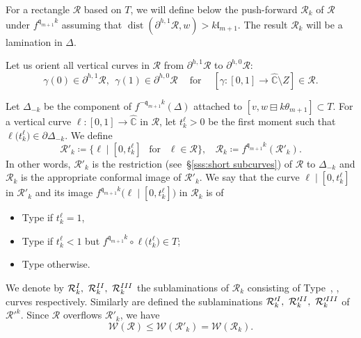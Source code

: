 \documentclass{amsart}
\renewcommand{\sp}{{\ \ }}
\newcommand{\1}{{\mathbb 1 }}
\newcommand{\Width}{{\mathcal W}}
\newcommand\RR{\mathcal{R}}
\newcommand{\qq}{\mathfrak{q}}
\newcommand{\length}{{\mathfrak l}}
\newcommand{\wC}{\widehat{\mathbb{C}}}
\theoremstyle{remark}
\numberwithin{equation}{section}
\theoremstyle{definition}
\newcommand{\dist}{\operatorname{dist}}
\newcommand{\RN}[1]{\MakeUppercase{\romannumeral#1}}%
\begin{document}
For a rectangle $\RR$ based on $ T$, we will define below the push-forward $\RR_k$ of $\RR$ under $f^{\qq_{m+1}k}$ assuming that $\dist (\partial ^{h,1}\RR,w)>k\length_{m+1}$. The result $\RR_k$ will be a lamination in $\Delta$. 


Let us orient all vertical curves in $\RR$ from $\partial^{h,1} \RR$ to $\partial^{h,0} \RR $:
\begin{equation}
\gamma(0)\in \partial^{h,1}\RR,\sp  \gamma(1)\in \partial^{h,0}\RR\sp \sp\text{ for }\sp\sp [\gamma\colon [0,1]\to \wC\setminus Z]\in \RR.
\end{equation}





Let $\Delta_{-k}$ be the component of $f^{-\qq_{m+1}k}(\Delta)$ attached to $[v,w \boxminus k\theta_{m+1} ]\subset T$. For a vertical curve $\ell\colon [0,1]\to \wC$ in $\RR$, let $t_k^\ell >0$ be the first moment such that $\ell\big(t^\ell_k\big)\in \partial \Delta_{-k}$. 
We define 
\[\RR'_k\coloneqq \{\ell\mid [0,t_k^\ell] \sp \text{ for }\sp \ell\in \RR\},\sp\sp \RR_k\coloneqq f^{\qq_{m+1}k }(\RR'_k).\]
In other words, $\RR'_k$ is the restriction (see~\S\ref{sss:short subcurves}) of $\RR$ to $\Delta_{-k}$ and $\RR_k$ is the appropriate conformal image of $\RR'_k$. 
 We say that the curve $\ell\mid [0,t_k^\ell]$ in $\RR'_k$ and its image $f^{\qq_{m+1}k}\big(\ell\mid [0,t_k^\ell] \big)$ in $\RR_k$ is of
\begin{itemize}
\item {Type \RN{1}} if $t_k^\ell=1$,
\item {Type \RN{2}} if $t_k^\ell<1$ but $f^{\qq_{m+1}k} \circ \ell\big(t_k^\ell\big)\in T$;
\item {Type \RN{3}} otherwise.
\end{itemize}
We denote by $\RR^{\RN{1}}_k,\ \RR^{\RN{2}}_k,\ \RR^{\RN{3}}_k$ the sublaminations of $\RR_k$ consisting of Type~\RN{1}, \RN{2}, \RN{3}  curves respectively. Similarly are defined the sublaminations $\RR'^{\RN{1}}_k,\ \RR'^{\RN{2}}_k,\ \RR'^{\RN{3}}_k$ of  $\RR'^k$. Since $\RR$ overflows $\RR'_k$, we have
\begin{equation}
\label{eq:RR_k:monot}
\Width(\RR)\le \Width(\RR'_k) = \Width(\RR_k).
\end{equation}

 
 
 
\end{document}
